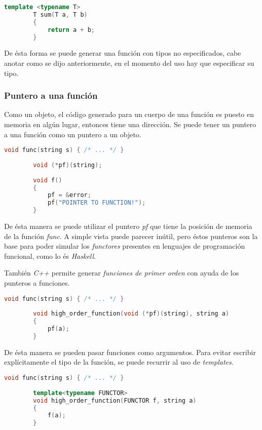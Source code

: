 		\begin{lstlisting}[language=C++, caption=Función que suma dos variables de tipo T]
		template <typename T>
		T sum(T a, T b)
		{
			return a + b;
		}
		\end{lstlisting}
		
		De ésta forma se puede generar una función con tipos no especificados, cabe anotar como se dijo anteriormente, en el momento del uso hay que especificar su tipo.
	
	\subsubsection{Puntero a una función}
		Como un objeto, el código generado para un cuerpo de una función es puesto en memoria en algún lugar, entonces tiene una dirección. Se puede tener un puntero a una función como un puntero a un objeto. \cite{Bjarne2013}
		
		\begin{lstlisting}[language=C++, caption=Puntero a una función]
		void func(string s) { /* ... */ }
		
		void (*pf)(string);
		
		void f()
		{
			pf = &error;
			pf("POINTER TO FUNCTION!");
		}
		\end{lstlisting}
		
		De ésta manera se puede utilizar el puntero \emph{pf} que tiene la posición de memoria de la función \emph{func}. A simple vista puede parecer inútil, pero éstos punteros son la base para poder simular los \emph{functores} presentes en lenguajes de programación funcional, como lo és \emph{Haskell}.
		
		También \emph{C++} permite generar \emph{funciones de primer orden} con ayuda de los punteros a funciones.
		
		\begin{lstlisting}[language=C++, caption=Funciones de primer orden]
		void func(string s) { /* ... */ }
		
		void high_order_function(void (*pf)(string), string a)
		{
			pf(a);
		}
		\end{lstlisting}
		
		De ésta manera se pueden pasar funciones como argumentos. Para evitar escribir explícitamente el tipo de la función, se puede recurrir al uso de \emph{templates}.
		
		\begin{lstlisting}[language=C++, caption=Funciones de primer orden con templates]
		void func(string s) { /* ... */ }
		
		template<typename FUNCTOR>
		void high_order_function(FUNCTOR f, string a)
		{ 
			f(a);
		}
		\end{lstlisting}
		
